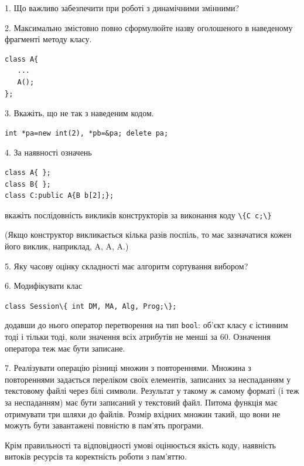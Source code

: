\documentclass[12pt, ukrainian]{article}
\def\code#1{\Verb!#1!}
\begin{document}
{%
1. Що важливо забезпечити при роботі з динамічними змінними?%
\par
\vspace{2mm}
2. Максимально змістовно повно сформулюйте назву оголошеного в наведеному фрагменті методу класу.
\vspace{-3mm}
\begin{verbatim}class A{
   ...
   A();
};\end{verbatim}
\vspace{-3mm}
\par
\vspace{2mm}
3. Вкажіть, що не так з наведеним кодом.
\vspace{-3mm}
\begin{verbatim}int *pa=new int(2), *pb=&pa; delete pa;\end{verbatim}
\vspace{-3mm}
\par
\vspace{2mm}
4. За наявності означень
\vspace{-3mm}
\begin{verbatim}
class A{ };
class B{ };
class C:public A{B b[2];};\end{verbatim}
\vspace{-3mm}
вкажіть послідовність викликів конструкторів за виконання коду \code{\{C c;\}} 

(Якщо конструктор викликається кілька разів поспіль, то має зазначатися кожен його виклик, наприклад, A, A, A.)

\vspace{2mm}
5. Яку часову оцінку складності має алгоритм сортування вибором?
\par
\vspace{2mm}
6. Модифікувати клас 

\qquad\code{class Session\{ int DM, MA, Alg, Prog;\};} 


додавши до нього оператор перетворення на тип \code{bool}: об'єкт класу є істинним тоді і тільки тоді, коли значення всіх атрибутів не менші за 60. Означення оператора теж має бути записане.%
\par
\vspace{2mm}
7. 
Реалізувати операцію різниці множин з повтореннями. Множина з повтореннями задається переліком своїх елементів, записаних за неспаданням у текстовому файлі через білі символи. Результат у такому ж самому форматі (і теж за неспаданням) має бути записаний у текстовий файл. Питома функція має отримувати три шляхи до файлів. Розмір вхідних множин такий, що вони не можуть бути завантажені повністю в пам’ять програми.

Крім правильності та відповідності умові оцінюється якість коду, наявність витоків ресурсів та коректність роботи з пам'яттю. 

}
\end{document}
